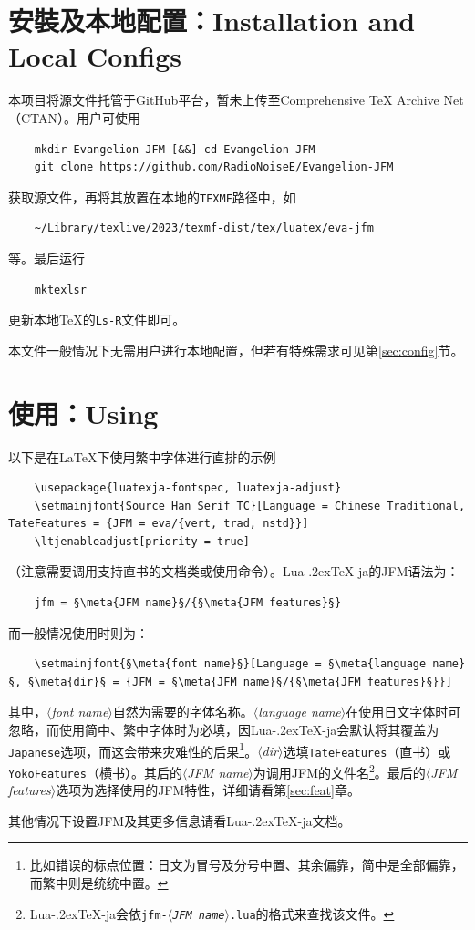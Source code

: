 \documentclass{ltjsarticle}
\def\meta#1{{\normalfont\rmfamily\itshape$\langle$#1\/$\rangle$}}
\def\段{\par}
\def\LuaTeX{Lua\kern-.2ex\TeX}
\begin{document}
\section{安裝及本地配置：Installation and Local Configs}
本项目将源文件托管于GitHub平台，暂未上传至Comprehensive \TeX{} Archive Net（CTAN）。用户可使用
\begin{lstlisting}
    mkdir Evangelion-JFM [&&] cd Evangelion-JFM
    git clone https://github.com/RadioNoiseE/Evangelion-JFM
\end{lstlisting}
获取源文件，再将其放置在本地的\texttt{TEXMF}路径中，如
\begin{lstlisting}
    ~/Library/texlive/2023/texmf-dist/tex/luatex/eva-jfm
\end{lstlisting}
等。最后运行
\begin{lstlisting}
    mktexlsr
\end{lstlisting}
更新本地\TeX{}的\texttt{Ls-R}文件即可。\段
本文件一般情况下无需用户进行本地配置，但若有特殊需求可见第\ref{sec:config}节。

\section{使用：Using}
以下是在\LaTeX{}下使用繁中字体进行直排的示例
\begin{lstlisting}
    \usepackage{luatexja-fontspec, luatexja-adjust}
    \setmainjfont{Source Han Serif TC}[Language = Chinese Traditional, TateFeatures = {JFM = eva/{vert, trad, nstd}}]
    \ltjenableadjust[priority = true]
\end{lstlisting}
（注意需要调用支持直书的文档类或使用\texttt{\string\tate}命令）。\LuaTeX-ja的JFM语法为：
\begin{lstlisting}
    jfm = §\meta{JFM name}§/{§\meta{JFM features}§}
\end{lstlisting}
而一般情况使用\texttt{\string\setmainjfont}时则为：
\begin{lstlisting}
    \setmainjfont{§\meta{font name}§}[Language = §\meta{language name}§, §\meta{dir}§ = {JFM = §\meta{JFM name}§/{§\meta{JFM features}§}}]
\end{lstlisting}
其中，\meta{font name}自然为需要的字体名称。\meta{language name}在使用日文字体时可忽略，而使用简中、繁中字体时为必填，因\LuaTeX-ja会默认将其覆盖为\texttt{Japanese}选项，而这会带来灾难性的后果\footnote{比如错误的标点位置：日文为冒号及分号中置、其余偏靠，简中是全部偏靠，而繁中则是统统中置。}。\meta{dir}选填\texttt{TateFeatures}（直书）或\texttt{YokoFeatures}（横书）。其后的\meta{JFM name}为调用JFM的文件名\footnote{\LuaTeX-ja会依\texttt{jfm-\meta{JFM name}.lua}的格式来查找该文件。}。最后的\meta{JFM features}选项为选择使用的JFM特性，详细请看第\ref{sec:feat}章。\段
其他情况下设置JFM及其更多信息请看\LuaTeX-ja文档\cite{luatexja-doc}。
\end{document}
